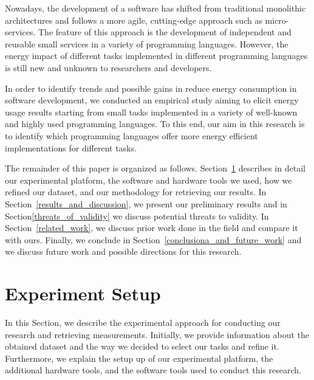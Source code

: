 Nowadays, the development of a software has shifted from traditional 
monolithic architectures and follows a more agile, cutting-edge 
approach such as micro-services. 
The feature of this approach is the development of independent and 
reusable small services in a variety of programming languages.
However, the energy impact of different tasks implemented in different 
programming languages is still new and unknown to researchers and
developers.


In order to identify trends and possible gains in reduce energy 
consumption in software development, we conducted an empirical 
study aiming to elicit energy usage results starting from small 
tasks implemented in a variety of well-known and highly used 
programming languages. 
To this end, our aim in this research is to identify which 
programming languages offer more energy efficient implementations 
for different tasks.


The remainder of this paper is organized as follows.
Section~\ref{experiment_setup} describes in detail our experimental 
platform, the software and hardware tools we used, how we 
refined our dataset, and our methodology for retrieving our results. 
In Section~\ref{results_and_discussion}, we present our preliminary results and in Section\ref{threats_of_validity} we discuss potential threats to validity.
In Section~\ref{related_work}, we discuss prior work done in the 
field and compare it with ours.
Finally, we conclude in Section~\ref{conclusiona_and_future_work} 
and we discuss future work and possible directions for this 
research.

\section{Experiment Setup} \label{experiment_setup}
In this Section, we describe the experimental approach for conducting  
our research and retrieving measurements. 
Initially, we provide information about the obtained dataset 
and the way we decided to select our tasks and refine it. 
Furthermore, we explain the setup up of our experimental 
platform, the additional hardware tools, and the software 
tools used to conduct this research. 

